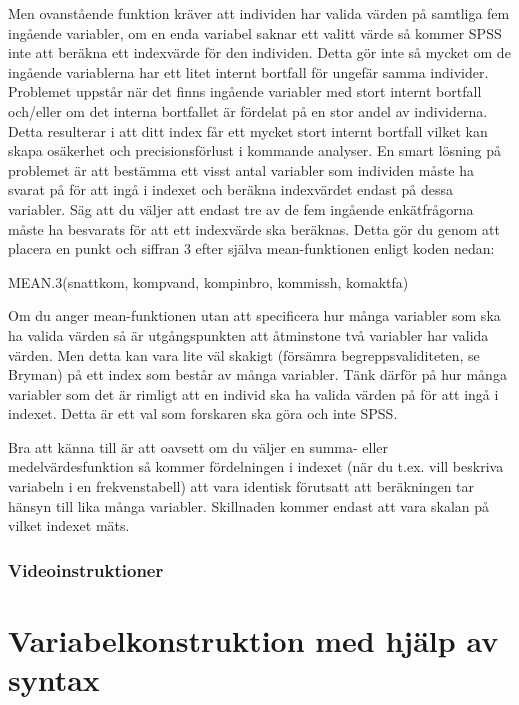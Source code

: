 \documentclass[
]{book}
\newenvironment{Shaded}{\begin{snugshade}}{\end{snugshade}}
\newcommand{\FunctionTok}[1]{\textcolor[rgb]{0.00,0.00,0.00}{#1}}
\newcommand{\NormalTok}[1]{#1}
\begin{document}
Men ovanstående funktion kräver att individen har valida värden på samtliga fem ingående variabler,
om en enda variabel saknar ett valitt värde så kommer SPSS inte att beräkna ett indexvärde för den
individen. Detta gör inte så mycket om de ingående variablerna har ett litet internt bortfall för ungefär
samma individer. Problemet uppstår när det finns ingående variabler med stort internt bortfall och/eller
om det interna bortfallet är fördelat på en stor andel av individerna. Detta resulterar i att ditt index får
ett mycket stort internt bortfall vilket kan skapa osäkerhet och precisionsförlust i kommande analyser.
En smart lösning på problemet är att bestämma ett visst antal variabler som individen måste ha svarat
på för att ingå i indexet och beräkna indexvärdet endast på dessa variabler. Säg att du väljer att endast
tre av de fem ingående enkätfrågorna måste ha besvarats för att ett indexvärde ska beräknas. Detta gör
du genom att placera en punkt och siffran 3 efter själva mean-funktionen enligt koden nedan:

\begin{Shaded}
\begin{Highlighting}[]
\FunctionTok{MEAN.3}\NormalTok{(snattkom, kompvand, kompinbro, kommissh, komaktfa)}
\end{Highlighting}
\end{Shaded}

Om du anger mean-funktionen utan att specificera hur många variabler som ska ha valida värden så är
utgångspunkten att åtminstone två variabler har valida värden. Men detta kan vara lite väl skakigt
(försämra begreppsvaliditeten, se Bryman) på ett index som består av många variabler. Tänk därför på
hur många variabler som det är rimligt att en individ ska ha valida värden på för att ingå i indexet. Detta
är ett val som forskaren ska göra och inte SPSS.

Bra att känna till är att oavsett om du väljer en summa- eller medelvärdesfunktion så kommer
fördelningen i indexet (när du t.ex. vill beskriva variabeln i en frekvenstabell) att vara identisk förutsatt att beräkningen tar hänsyn till lika många variabler. Skillnaden kommer endast att vara skalan på vilket indexet mäts.

\hypertarget{videoinstruktioner-1}{%
\subsection{Videoinstruktioner}\label{videoinstruktioner-1}}

\hypertarget{variabelkonstruktion-med-hjuxe4lp-av-syntax}{%
\chapter{Variabelkonstruktion med hjälp av syntax}\label{variabelkonstruktion-med-hjuxe4lp-av-syntax}}
\end{document}
